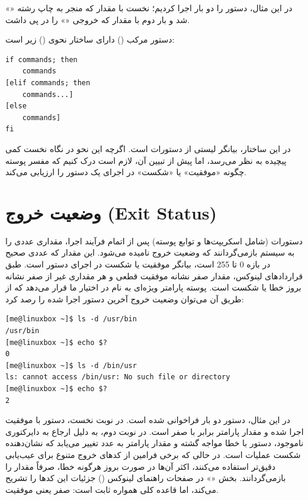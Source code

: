 در این مثال، دستور را دو بار اجرا کردیم؛ نخست با مقدار  که منجر به چاپ رشته «» شد و بار دوم با مقدار  که خروجی «» را در پی داشت.

دستور مرکب ()  دارای ساختار نحوی () زیر است:

\begin{latin}
\begin{lstlisting}
if commands; then
    commands
[elif commands; then
    commands...]
[else
    commands]
fi
\end{lstlisting}
\end{latin}

در این ساختار،  بیانگر لیستی از دستورات است. اگرچه این نحو در نگاه نخست کمی پیچیده به نظر می‌رسد، اما پیش از تبیین آن، لازم است درک کنیم که مفسر پوسته چگونه «موفقیت» یا «شکست» در اجرای یک دستور را ارزیابی می‌کند.

\section{وضعیت خروج (Exit Status)}

دستورات (شامل اسکریپت‌ها و توابع پوسته) پس از اتمام فرآیند اجرا، مقداری عددی را به سیستم بازمی‌گردانند که وضعیت خروج نامیده می‌شود. این مقدار که عددی صحیح در بازه 0 تا 255 است، بیانگر موفقیت یا شکست در اجرای دستور است. طبق قراردادهای لینوکس، مقدار صفر نشانه موفقیت قطعی و هر مقداری غیر از صفر نشانه بروز خطا یا شکست است. پوسته پارامتر ویژه‌ای به نام  در اختیار ما قرار می‌دهد که از طریق آن می‌توان وضعیت خروج آخرین دستور اجرا شده را رصد کرد:

\begin{latin}
\begin{lstlisting}
[me@linuxbox ~]$ ls -d /usr/bin
/usr/bin
[me@linuxbox ~]$ echo $?
0
[me@linuxbox ~]$ ls -d /bin/usr
ls: cannot access /bin/usr: No such file or directory
[me@linuxbox ~]$ echo $?
2
\end{lstlisting}
\end{latin}

در این مثال، دستور  دو بار فراخوانی شده است. در نوبت نخست، دستور با موفقیت اجرا شده و مقدار پارامتر  برابر با صفر است. در نوبت دوم، به دلیل ارجاع به دایرکتوری ناموجود، دستور با خطا مواجه گشته و مقدار پارامتر  به عدد  تغییر می‌یابد که نشان‌دهنده شکست عملیات است. در حالی که برخی فرامین از کدهای خروج متنوع برای عیب‌یابی دقیق‌تر استفاده می‌کنند، اکثر آن‌ها در صورت بروز هرگونه خطا، صرفاً مقدار  را بازمی‌گردانند. بخش «» در صفحات راهنمای لینوکس () جزئیات این کدها را تشریح می‌کند، اما قاعده کلی همواره ثابت است: صفر یعنی موفقیت.

